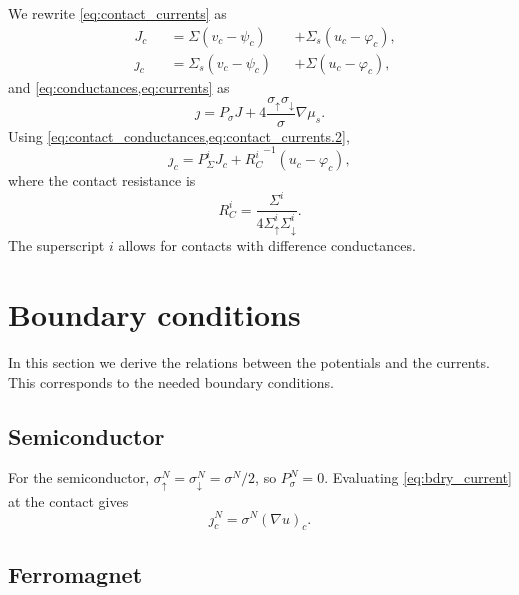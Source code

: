We rewrite \cref{eq:contact_currents} as
\begin{subequations}\label{eq:contact_currents.2}
  \begin{alignat}{3}
    \label{eq:contact_currents.2.current}
    & J_c && = Σ   \left( v_c - ψ_c \right) && + Σ_s \left( u_c - φ_c \right),
    \\
    \label{eq:contact_currents.2.spincurrent}
    & ȷ_c && = Σ_s \left( v_c - ψ_c \right) && + Σ   \left( u_c - φ_c \right),
  \end{alignat}
\end{subequations}
and \cref{eq:conductances,eq:currents} as
\begin{equation}
  \label{eq:bdry_current}
  ȷ = P_σ J + 4 \frac{σ_↑ σ_↓}{σ} ∇μ_s.
\end{equation}
Using \cref{eq:contact_conductances,eq:contact_currents.2},
\begin{equation}
  \label{eq:bdry_current_contact}
  ȷ_c = P_Σ^i J_c + {R_C^i}^{-1} \left( u_c - φ_c \right),
\end{equation}
where the contact resistance is
\begin{equation}
  \label{eq:contact.resistance}
  R_C^i = \frac{Σ^i}{4 Σ_↑^i Σ_↓^i}.
\end{equation}
The superscript $i$ allows for contacts with difference conductances.

\section{Boundary conditions}

In this section we derive the relations between
the potentials and the currents.
This corresponds to the needed boundary conditions.

\subsection{Semiconductor}

For the semiconductor, $σ^N_↑ = σ^N_↓ = σ^N / 2$, so $P_σ^N = 0$.
Evaluating \cref{eq:bdry_current} at the contact gives
\begin{equation}
  \label{eq:bdry_current.semiconductor}
  ȷ^N_c = σ^N {( ∇u )}_c.
\end{equation}

\subsection{Ferromagnet}

